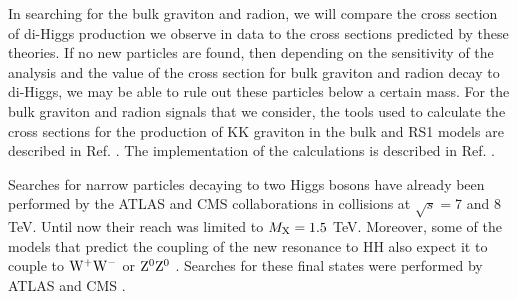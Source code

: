 In searching for the bulk graviton and radion, we will compare the cross section of di-Higgs production we observe in data to the cross sections predicted by these theories. If no new particles are found, then depending on the sensitivity of the analysis and the value of the cross section for bulk graviton and radion decay to di-Higgs, we may be able to rule out these particles below a certain mass. For the bulk graviton and radion signals that we consider, the tools used to calculate the cross sections for the production of KK graviton in the bulk and RS1 models are described in Ref. \cite{Agashe:2013kyb, deAquino:2011ix}. The implementation of the calculations is described in Ref. \cite{Oliveira:2014kla}.   


Searches for narrow particles decaying to two Higgs bosons have already been performed by the ATLAS \cite{Aad:2014yja, Aad:2015uka, Aad:2015xja} and CMS \cite{Khachatryan:2014jya,Khachatryan:2015year,Khachatryan:2015tha} collaborations in \Pp\Pp collisions at $\sqrt{s} = $7 and 8 TeV. Until now their reach was limited to $M_{\rm X} = 1.5$ TeV. Moreover, some of the models that predict the coupling of the new resonance to HH also expect it to couple to $\rm W^{+}\rm W^{-}$ or $\rm Z^{0}\rm Z^{0}$ \cite{Brehmer:2015dan}. Searches for these final states were performed by ATLAS and CMS \cite{ATLASVV, ATLASWV, ATLASZV, Khachatryan:2014hpa, CMSZVWV}. 


